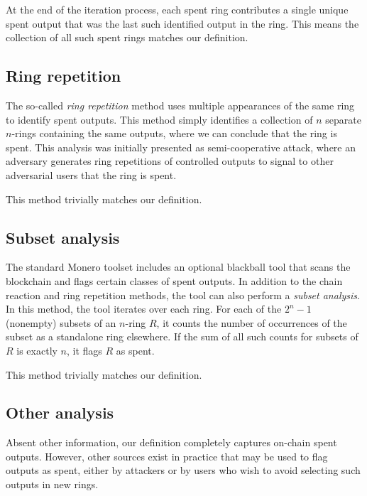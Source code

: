 \documentclass{mrl}
\begin{document}
At the end of the iteration process, each spent ring contributes a single unique spent output that was the last such identified output in the ring. This means the collection of all such spent rings matches our definition.

\subsection{Ring repetition}
The so-called \textit{ring repetition} method uses multiple appearances of the same ring to identify spent outputs. This method simply identifies a collection of $n$ separate $n$-rings containing the same outputs, where we can conclude that the ring is spent. This analysis was initially presented as semi-cooperative attack, where an adversary generates ring repetitions of controlled outputs to signal to other adversarial users that the ring is spent.

This method trivially matches our definition.

\subsection{Subset analysis}
The standard Monero toolset includes an optional blackball tool that scans the blockchain and flags certain classes of spent outputs. In addition to the chain reaction and ring repetition methods, the tool can also perform a \textit{subset analysis}. In this method, the tool iterates over each ring. For each of the $2^n-1$ (nonempty) subsets of an $n$-ring $R$, it counts the number of occurrences of the subset as a standalone ring elsewhere. If the sum of all such counts for subsets of $R$ is exactly $n$, it flags $R$ as spent.

This method trivially matches our definition.

\subsection{Other analysis}
Absent other information, our definition completely captures on-chain spent outputs. However, other sources exist in practice that may be used to flag outputs as spent, either by attackers or by users who wish to avoid selecting such outputs in new rings.
\end{document}
